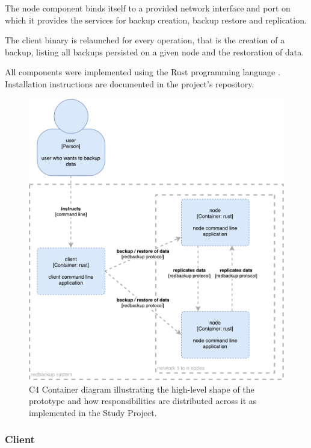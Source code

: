 The \gls{node} component binds itself to a provided network interface and port on which it provides the services for backup creation, backup restore and replication.

The \gls{client} binary is relaunched for every operation, that is the creation of a backup,  listing all backups persisted on a given \gls{node} and the restoration of data.

All components were implemented using the Rust programming language \cite{rustlang-org}. Installation instructions are documented in the project's repository.

\begin{figure}[h]
	\centering
	\includegraphics[width=1\linewidth]{resources/c4-sa-container}
	\caption[SA specific C4 Container diagram]{C4 Container diagram illustrating the high-level shape of the prototype and how responsibilities are distributed across it as implemented in the Study Project.}
	\label{fig:c4-sa-container}
\end{figure}

\subsubsection{Client}



